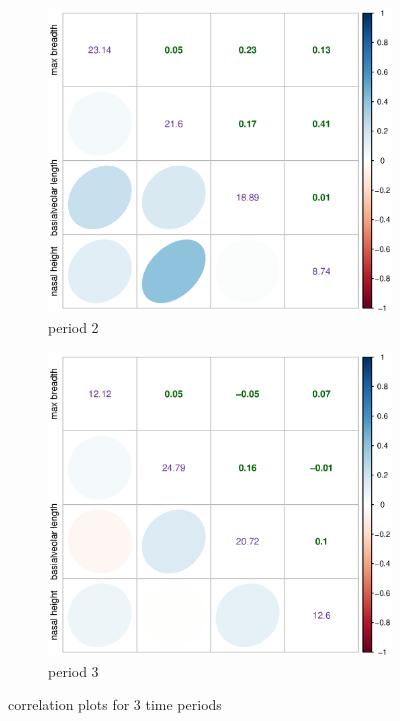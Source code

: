 \documentclass{article}
\begin{document}
\begin{enumerate}[leftmargin = 0 em, label = \arabic*., font = \bfseries]
\begin{enumerate}
\begin{figure}[!htb]
\begin{subfigure}[b]{0.33\textwidth}
			\includegraphics[width = \textwidth]{coorplot_2.eps}
			\caption{period 2}
			\end{subfigure}%
			\begin{subfigure}[b]{0.33\textwidth}
			\includegraphics[width = \textwidth]{coorplot_3.eps}
			\caption{period 3}
			\end{subfigure}
			\caption{correlation plots for 3 time periods}
			\label{corrplot}
		\end{figure}


\end{enumerate}
\end{enumerate}
\end{document}
